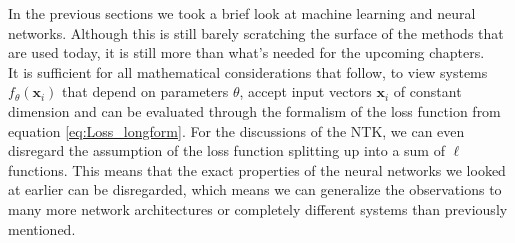 In the previous sections we took a brief look at machine learning and neural networks. Although this is still barely scratching the surface of the methods that are used today, it is still more than what's needed for the upcoming chapters.\\
It is sufficient for all mathematical considerations that follow, to view systems $f_\theta(\mathbf{x}_i)$ that depend on parameters $\theta$, accept input vectors $\mathbf{x}_i$ of constant dimension and can be evaluated through the formalism of the loss function from equation \cref{eq:Loss_longform}. For the discussions of the NTK, we can even disregard the assumption of the loss function splitting up into a sum of $\ell$ functions. This means that the exact properties of the neural networks we looked at earlier can be disregarded, which means we can generalize the observations to many more network architectures or completely different systems than previously mentioned.